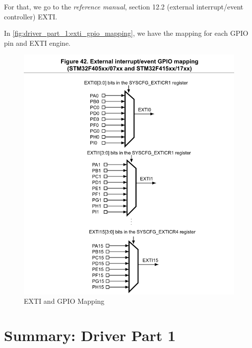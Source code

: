 For that, we go to the \textit{reference manual}, section 12.2 (external interrupt/event controller) EXTI.

In \autoref{fig:driver_part_1:exti_gpio_mapping}, we have the mapping for each GPIO pin and EXTI engine. 

\begin{figure}[h]
\centering
\includegraphics[scale=0.5]{Figures/driver_part_1/exti_gpio_mapping}
\caption{EXTI and GPIO Mapping}
\label{fig:driver_part_1:exti_gpio_mapping}
\end{figure}


\newpage
\section{Summary: Driver Part 1}

